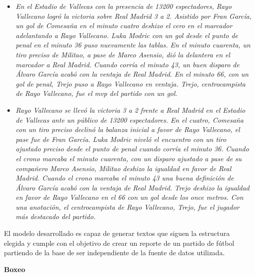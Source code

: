 \begin{itemize}
    \item \textit{En el Estadio de Vallecas con la presencia de 13200 espectadores, Rayo Vallecano logró la victoria sobre Real Madrid 3 a 2.
    Asistido por Fran García, un gol de Comesaña en el minuto cuatro deshizo el cero en el marcador adelantando a Rayo Vallecano. Luka Modric con un gol desde el punto de penal en el minuto 36 puso nuevamente las tablas. En el minuto cuarenta, un tiro preciso de Militao, a pase de Marco Asensio, dió la delantera en el marcador a Real Madrid. Cuando corría el minuto 43, un buen disparo de Álvaro García acabó con la ventaja de Real Madrid. En el minuto 66, con un gol de penal, Trejo puso a Rayo Vallecano en ventaja.
    Trejo, centrocampista de Rayo Vallecano, fue el mvp del partido con un gol.}
    \item \textit{Rayo Vallecano se llevó la victoria 3 a 2 frente a Real Madrid en el Estadio de Vallecas ante un público de 13200 espectadores.
    En el cuatro, Comesaña con un tiro preciso declinó la balanza inicial a favor de Rayo Vallecano, el pase fue de Fran García. Luka Modric niveló el encuentro con un tiro ajustado preciso desde el punto de penal cuando corría el minuto 36. Cuando el crono marcaba el minuto cuarenta, con un disparo ajustado a pase de su compañero Marco Asensio, Militao deshizo la igualdad en favor de Real Madrid. Cuando el crono marcaba el minuto 43 una buena definición de Álvaro García acabó con la ventaja de Real Madrid. Trejo deshizo la igualdad en favor de Rayo Vallecano en el 66 con un gol desde los once metros.
    Con una anotación, el centrocampista de Rayo Vallecano, Trejo, fue el jugador más destacado del partido.}
\end{itemize}

El modelo desarrollado es capaz de generar textos que siguen la estructura elegida y cumple con el objetivo de 
crear un reporte de un partido de fútbol partiendo de la base de ser independiente de la fuente de datos utilizada. 

\pagebreak

    \textbf{Boxeo}\\



